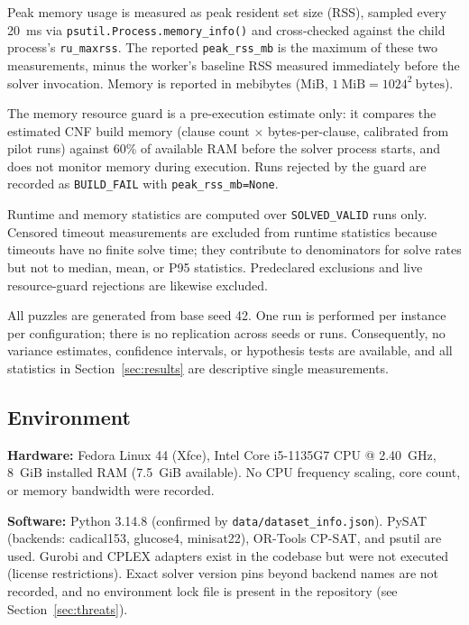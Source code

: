 \documentclass[a4paper,fleqn]{cas-sc}
\newcommand{\code}[1]{\texttt{\nolinkurl{#1}}}
\begin{document}
Peak memory usage is measured as peak resident set size (RSS), sampled every 20~ms via \code{psutil.Process.memory_info()} and cross-checked against the child process's \texttt{ru\_maxrss}. The reported \texttt{peak\_rss\_mb} is the maximum of these two measurements, minus the worker's baseline RSS measured immediately before the solver invocation. Memory is reported in mebibytes (MiB, \(1~\mathrm{MiB}=1024^2~\mathrm{bytes}\)).

The memory resource guard is a pre-execution estimate only: it compares the estimated CNF build memory (clause count \(\times\) bytes-per-clause, calibrated from pilot runs) against 60\% of available RAM before the solver process starts, and does not monitor memory during execution. Runs rejected by the guard are recorded as \texttt{BUILD\_FAIL} with \code{peak_rss_mb=None}.

Runtime and memory statistics are computed over \texttt{SOLVED\_VALID} runs only. Censored timeout measurements are excluded from runtime statistics because timeouts have no finite solve time; they contribute to denominators for solve rates but not to median, mean, or P95 statistics. Predeclared exclusions and live resource-guard rejections are likewise excluded.

All puzzles are generated from base seed 42. One run is performed per instance per configuration; there is no replication across seeds or runs. Consequently, no variance estimates, confidence intervals, or hypothesis tests are available, and all statistics in Section~\ref{sec:results} are descriptive single measurements.

\subsection{Environment}

\textbf{Hardware:} Fedora Linux 44 (Xfce), Intel Core i5-1135G7 CPU @ 2.40~GHz, 8~GiB installed RAM (7.5~GiB available). No CPU frequency scaling, core count, or memory bandwidth were recorded.

\textbf{Software:} Python 3.14.8 (confirmed by \code{data/dataset_info.json}). PySAT (backends: cadical153, glucose4, minisat22), OR-Tools CP-SAT, and psutil are used. Gurobi and CPLEX adapters exist in the codebase but were not executed (license restrictions). Exact solver version pins beyond backend names are not recorded, and no environment lock file is present in the repository (see Section~\ref{sec:threats}).

\end{document}
